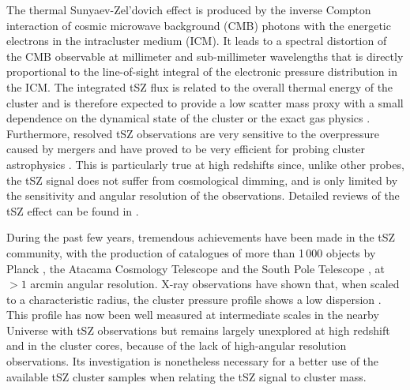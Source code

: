 \documentclass[twocolumn,traditabstract]{aa}
\begin{document}
The thermal Sunyaev-Zel'dovich effect \citep[tSZ,][]{sunyaev1972,sunyaev1980} is produced by the inverse Compton interaction of cosmic microwave background (CMB) photons with the energetic electrons in the intracluster medium (ICM). It leads to a spectral distortion of the CMB observable at millimeter and sub-millimeter wavelengths that is directly proportional to the line-of-sight integral of the electronic pressure distribution in the ICM. The integrated tSZ flux is related to the overall thermal energy of the cluster and is therefore expected to provide a low scatter mass proxy with a small dependence on the dynamical state of the cluster or the exact gas physics \citep[e.g.][]{dasilva2004,motl2005,nagai2006}. Furthermore, resolved tSZ observations are very sensitive to the overpressure caused by mergers and have proved to be very efficient for probing cluster astrophysics \citep[see for example results by][]{pointecouteau1999,komatsu2001,korngut2011,adam2013,young2014,adam2014,mroczkowski2015}. This is particularly true at high redshifts since, unlike other probes, the tSZ signal does not suffer from cosmological dimming, and is only limited by the sensitivity and angular resolution of the observations. Detailed reviews of the tSZ effect can be found in \cite{birkinshaw1999,carlstrom2002,kitayama2014}.

During the past few years, tremendous achievements have been made in the tSZ community, with the production of catalogues of more than 1\,000 objects by Planck \citep{planck2013catalogue}, the Atacama Cosmology Telescope \citep[ACT,][]{hasselfield2013} and the South Pole Telescope \citep[SPT,][]{reichardt2013,bleem2014}, at $>1$ arcmin angular resolution. X-ray observations have shown that, when  scaled to a characteristic radius, the cluster pressure profile shows a low dispersion \citep{arnaud2010}. This profile has now been well measured at intermediate scales in the nearby Universe with tSZ observations \citep{planck2013pressure_profile,sayers2013b} but remains largely unexplored at high redshift and in the cluster cores, because of the lack of high-angular resolution observations. Its investigation is nonetheless necessary for a better use of the available tSZ cluster samples when relating the tSZ signal to cluster mass.
\end{document}

